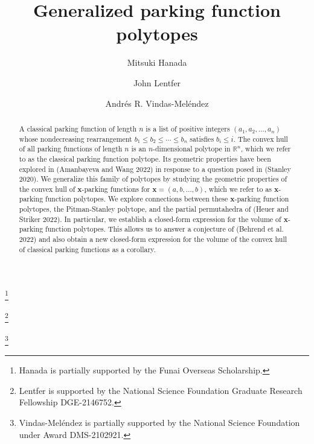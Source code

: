 \documentclass[11pt]{amsart}
\theoremstyle{definition}
\newcommand{\0}{\emptyset}
\begin{document}
\title{Generalized parking function polytopes}

\author{Mitsuki Hanada}
\thanks{Hanada is partially supported by the Funai Overseas Scholarship.}
\address{Department of Mathematics\\
         University of California, Berkeley\\
\url{https://math.berkeley.edu/~mhanada/}}

\author{John Lentfer}
\thanks{Lentfer is supported by the National Science Foundation Graduate Research Fellowship DGE-2146752.}
\address{Department of Mathematics\\
         University of California, Berkeley\\
\url{https://math.berkeley.edu/~jlentfer/}}


\author{Andr\'es R. Vindas-Mel\'endez}
\thanks{Vindas-Mel\'endez is partially supported by the National Science Foundation under Award DMS-2102921.}
\address{Department of Mathematics\\
         University of California, Berkeley\\
\url{https://math.berkeley.edu/~vindas}}





\begin{abstract}
A classical parking function of length $n$ is a list of positive integers $(a_1, a_2, \ldots, a_n)$ whose nondecreasing rearrangement $b_1 \leq b_2 \leq \cdots \leq b_n$ satisfies $b_i \leq i$.
The convex hull of all parking functions of length $n$ is an $n$-dimensional polytope in $\mathbb{R}^n$, which we refer to as the classical parking function polytope. 
Its geometric properties have been explored in (Amanbayeva and Wang 2022) in response to a question posed in (Stanley 2020).
We generalize this family of polytopes by studying the geometric properties of the convex hull of $\mathbf{x}$-parking functions for $\mathbf{x}=(a,b,\dots,b)$, which we refer to as $\mathbf{x}$-parking function polytopes. 
We explore connections between these $\mathbf{x}$-parking function polytopes, the Pitman-Stanley polytope, and  the partial permutahedra of (Heuer and Striker 2022).
In particular, we establish a closed-form expression for the volume of $\mathbf{x}$-parking function polytopes.
This allows us to answer a conjecture of (Behrend et al. 2022) and also obtain a new closed-form expression for the volume of the convex hull of classical parking functions as a corollary.
\end{abstract}
\end{document}
